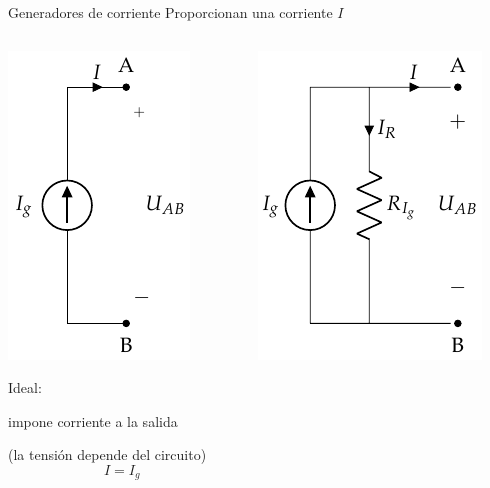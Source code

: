 \documentclass[aspectratio=169, xcolor={usenames,svgnames,dvipsnames}]{beamer}
\begin{document}
\begin{frame}{Generadores de corriente}
    Proporcionan una corriente $I$
    \vspace{-5mm}
    \begin{columns}[T]
    \begin{column}{0.4\columnwidth}
        \begin{center}
         \hspace*{-10mm}\includegraphics[height=0.5\textheight]{../figs/FuenteCorrienteIdeal.pdf}  

        \vspace{2mm}
        \alert{Ideal}: 
        
        impone corriente a la salida 
        
        \small{(la tensión depende del circuito)}
        \begin{equation*}
            I=I_g
        \end{equation*}
        \end{center}
    \end{column}
    \begin{column}{0.38\columnwidth}
        \begin{center}
        \hspace*{-10mm}\includegraphics[height=0.5\textheight]{../figs/FuenteCorrienteRealDC.pdf}
        

\end{center}
\end{column}
\end{columns}
\end{frame}
\end{document}
